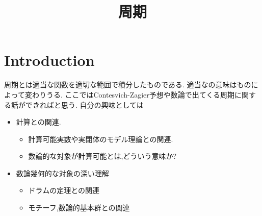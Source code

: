 \documentclass[uplatex,b5j,11pt]{jsbook}
\title{周期}
\begin{document}
\chapter{Introduction}
周期とは適当な関数を適切な範囲で積分したものである.
適当なの意味はものによって変わりうる.
ここではContesvich-Zagier予想や数論で出てくる周期に関する話ができればと思う.
自分の興味としては
\begin{itemize}
\item 計算との関連.
\begin{itemize}
  \item 計算可能実数や実閉体のモデル理論との関連.
  \item 数論的な対象が計算可能とは,どういう意味か?
\end{itemize}
\item 数論幾何的な対象の深い理解
\begin{itemize}
\item ドラムの定理との関連
\item モチーフ,数論的基本群との関連
\end{itemize}
\end{itemize}


%
%

\end{document}
